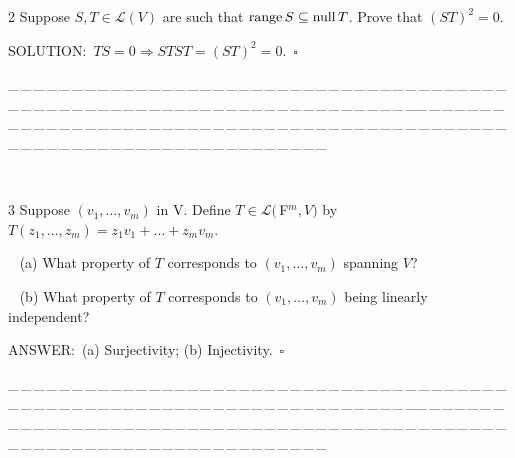 \documentclass[a4paper, 11pt, UTF8]{article}
\def\range{\textup{range}\,}
\def\null{\textup{null\,}}
\def\Lm{\mathcal{L}}
\def\Fbfc{$\,{\timesbf F}$}
\begin{document}
\begin{large}
{\timesbf\Large 2} {\timessl\Large 
Suppose $S,T\in\Lm(V)$ are such that $\range S\subseteq\null T$. Prove that $(ST)^2=0$.
}\par
{\timesbf S\footnotesize{OLUTION:}}\,\,\,$TS=0\Rightarrow STST=(ST)^2=0.\,\,\,\square$\par
{\tiny \_\,\_\,\_\,\_\,\_\,\_\,\_\,\_\,\_\,\_\,\_\,\_\,\_\,\_\,\_\,\_\,\_\,\_\,\_\,\_\,\_\,\_\,\_\,\_\,\_\,\_\,\_\,\_\,\_\,\_\,\_\,\_\,\_\,\_\,\_\,\_\,\_\,\_\,\_\,\_\,\_\,\_\,\_\,\_\,\_\,\_\,\_\,\_\,\_\,\_\,\_\,\_\,\_\,\_\,\_\,\_\,\_\,\_\,\_\,\_\,\_\,\_\,\_\,\_\,\_\,\_\,\_\,\_\,\_\,\_\,\_\_\,\_\,\_\,\_\,\_\,\_\,\_\,\_\,\_\,\_\,\_\,\_\,\_\,\_\,\_\,\_\,\_\,\_\,\_\,\_\,\_\,\_\,\_\,\_\,\_\,\_\,\_\,\_\,\_\,\_\,\_\,\_\,\_\,\_\,\_\,\_\,\_\,\_\,\_\,\_\,\_\,\_\,\_\,\_\,\_\,\_\,\_\,\_\,\_\,\_\,\_\,\_\,\_\,\_\,\_\,\_\,\_\,\_\,\_\,\_\,\_\,\_\,\_\,\_\,\_\,\_\,\_\,\_\,\_\,\_\,\_}{\tiny\,\par}

{\timesbf\Large 3} {\timessl\Large 
Suppose $(v_1,\dots,v_m)$ in V. Define $T\in\Lm(\Fbfc^m, V)$ by $T(z_1,\dots,z_m)=z_1 v_1+\dots+z_m v_m.$
}\par\,\,\,
(a) {\timessl\Large What property of $T$ corresponds to $(v_1,\dots,v_m)$ spanning $V$?
}\par\,\,\,
(b) {\timessl\Large
What property of $T$ corresponds to $(v_1,\dots,v_m)$ being linearly independent?
}\par
{\timesbf A\small{NSWER:}}\,\,\,(a) Surjectivity; (b) Injectivity.$\,\,\,\square$\par
{\tiny \_\,\_\,\_\,\_\,\_\,\_\,\_\,\_\,\_\,\_\,\_\,\_\,\_\,\_\,\_\,\_\,\_\,\_\,\_\,\_\,\_\,\_\,\_\,\_\,\_\,\_\,\_\,\_\,\_\,\_\,\_\,\_\,\_\,\_\,\_\,\_\,\_\,\_\,\_\,\_\,\_\,\_\,\_\,\_\,\_\,\_\,\_\,\_\,\_\,\_\,\_\,\_\,\_\,\_\,\_\,\_\,\_\,\_\,\_\,\_\,\_\,\_\,\_\,\_\,\_\,\_\,\_\,\_\,\_\,\_\,\_\_\,\_\,\_\,\_\,\_\,\_\,\_\,\_\,\_\,\_\,\_\,\_\,\_\,\_\,\_\,\_\,\_\,\_\,\_\,\_\,\_\,\_\,\_\,\_\,\_\,\_\,\_\,\_\,\_\,\_\,\_\,\_\,\_\,\_\,\_\,\_\,\_\,\_\,\_\,\_\,\_\,\_\,\_\,\_\,\_\,\_\,\_\,\_\,\_\,\_\,\_\,\_\,\_\,\_\,\_\,\_\,\_\,\_\,\_\,\_\,\_\,\_\,\_\,\_\,\_\,\_\,\_\,\_\,\_\,\_\,\_}{\tiny\,\par}


\end{large}
\end{document}
